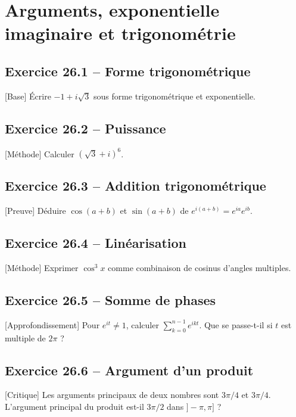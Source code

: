 \chapter{Arguments, exponentielle imaginaire et trigonométrie}
\section*{Exercice 26.1 -- Forme trigonométrique}
[Base] Écrire $-1+i\sqrt3$ sous forme trigonométrique et exponentielle.

\section*{Exercice 26.2 -- Puissance}
[Méthode] Calculer $(\sqrt3+i)^6$.

\section*{Exercice 26.3 -- Addition trigonométrique}
[Preuve] Déduire $\cos(a+b)$ et $\sin(a+b)$ de $e^{i(a+b)}=e^{i a}e^{i b}$.

\section*{Exercice 26.4 -- Linéarisation}
[Méthode] Exprimer $\cos^3x$ comme combinaison de cosinus d'angles multiples.

\section*{Exercice 26.5 -- Somme de phases}
[Approfondissement] Pour $e^{i t}\ne1$, calculer $\sum_{k=0}^{n-1}e^{i kt}$. Que se passe-t-il si $t$ est multiple de $2\pi$ ?

\section*{Exercice 26.6 -- Argument d’un produit}
[Critique] Les arguments principaux de deux nombres sont $3\pi/4$ et $3\pi/4$. L'argument principal du produit est-il $3\pi/2$ dans $]-\pi,\pi]$ ?
